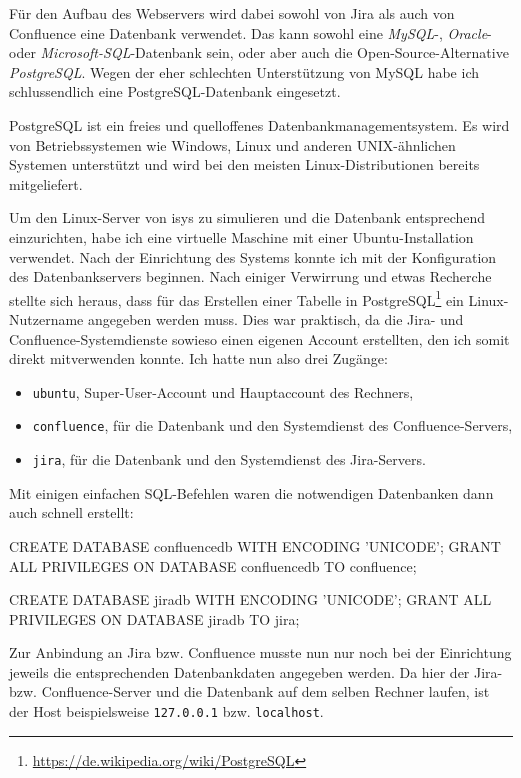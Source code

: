 \documentclass[xcolor=dvipsnames,11pt,paper=a4paper]{report}
\begin{document}
Für den Aufbau des Webservers wird dabei sowohl von Jira als auch von Confluence
eine Datenbank verwendet. Das kann sowohl eine \textit{MySQL}-, \textit{Oracle}-
oder \textit{Microsoft-SQL}-Datenbank sein, oder aber auch die Open-Source-Alternative
\textit{PostgreSQL}. Wegen der eher schlechten Unterstützung von MySQL habe ich
schlussendlich eine PostgreSQL-Datenbank eingesetzt.

PostgreSQL ist ein freies und quelloffenes Datenbankmanagementsystem. Es wird von
Betriebssystemen wie Windows, Linux und anderen UNIX-ähnlichen Systemen unterstützt
und wird bei den meisten Linux-Distributionen bereits mitgeliefert.

Um den Linux-Server von isys zu simulieren und die Datenbank entsprechend einzurichten,
habe ich eine virtuelle Maschine mit einer Ubuntu-Installation verwendet. Nach der
Einrichtung des Systems konnte ich mit der Konfiguration des Datenbankservers beginnen.
Nach einiger Verwirrung und etwas Recherche stellte sich heraus, dass für das Erstellen
einer Tabelle in PostgreSQL\footnote{\url{https://de.wikipedia.org/wiki/PostgreSQL}} ein Linux-Nutzername angegeben werden muss. Dies war
praktisch, da die Jira- und Confluence-Systemdienste sowieso einen eigenen Account
erstellten, den ich somit direkt mitverwenden konnte. Ich hatte nun also drei Zugänge:

\begin{itemize}
	\item \texttt{ubuntu}, Super-User-Account und Hauptaccount des Rechners,
	\item \texttt{confluence}, für die Datenbank und den Systemdienst des Confluence-Servers,
	\item \texttt{jira}, für die Datenbank und den Systemdienst des Jira-Servers.
\end{itemize}

Mit einigen einfachen SQL-Befehlen waren die notwendigen Datenbanken dann auch schnell
erstellt:

\begin{code}[language=SQL, caption={SQL-Befehle zur Erstellung der Datenbanken}, label={lst:jira-database}]
CREATE DATABASE confluencedb WITH ENCODING 'UNICODE';
GRANT ALL PRIVILEGES ON DATABASE confluencedb TO confluence;

CREATE DATABASE jiradb WITH ENCODING 'UNICODE';
GRANT ALL PRIVILEGES ON DATABASE jiradb TO jira;
\end{code}

Zur Anbindung an Jira bzw. Confluence musste nun nur noch bei der Einrichtung jeweils
die entsprechenden Datenbankdaten angegeben werden. Da hier der Jira- bzw. Confluence-Server
und die Datenbank auf dem selben Rechner laufen, ist der Host beispielsweise \texttt{127.0.0.1}
bzw. \texttt{localhost}.
\end{document}
